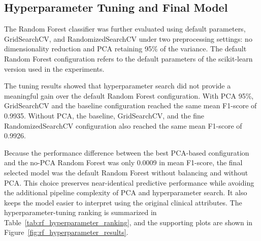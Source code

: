 \FloatBarrier

\subsection{Hyperparameter Tuning and Final Model}

The Random Forest classifier was further evaluated using default parameters,
GridSearchCV, and RandomizedSearchCV under two preprocessing settings: no
dimensionality reduction and PCA retaining 95\% of the variance. The default
Random Forest configuration refers to the default parameters of the
scikit-learn version used in the experiments.

The tuning results showed that hyperparameter search did not provide a
meaningful gain over the default Random Forest configuration. With PCA 95\%,
GridSearchCV and the baseline configuration reached the same mean F1-score of
0.9935. Without PCA, the baseline, GridSearchCV, and the fine RandomizedSearchCV
configuration also reached the same mean F1-score of 0.9926.

Because the performance difference between the best PCA-based configuration and
the no-PCA Random Forest was only 0.0009 in mean F1-score, the final selected
model was the default Random Forest without balancing and without PCA. This
choice preserves near-identical predictive performance while avoiding the
additional pipeline complexity of PCA and hyperparameter search. It also keeps
the model easier to interpret using the original clinical attributes. The
hyperparameter-tuning ranking is summarized in
Table~\ref{tab:rf_hyperparameter_ranking}, and the supporting plots are shown
in Figure~\ref{fig:rf_hyperparameter_results}.

\begin{table}[!htbp]
\centering
\caption{Random Forest hyperparameter-tuning ranking.}
\label{tab:rf_hyperparameter_ranking}
\end{table}

